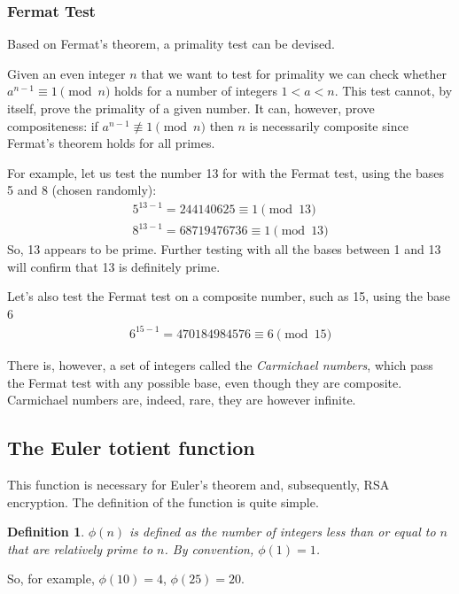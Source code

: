 \documentclass[12pt, titlepage]{article}
\newtheorem*{definition}{Definition}
\begin{document}
    \subsubsection{Fermat Test}
        Based on Fermat's theorem, a primality test can be devised.

        Given an even integer $n$ that we want to test for primality we can check whether
        $a^{n-1} \equiv 1 \pmod{n}$ holds for a number of integers $1<a<n$.  This test cannot,
        by itself, prove the primality of a given number. It can, however, prove compositeness:
        if $a^{n-1} \not\equiv 1 \pmod{n}$ then $n$ is necessarily composite since Fermat's
        theorem holds for all primes. \cite{primality_akalin}

        For example, let us test the number 13 for with the Fermat test, using the bases 5 and 8
        (chosen randomly):
        \begin{align*}
            5^{13-1} = 244140625   \equiv 1 \pmod{13}\\
            8^{13-1} = 68719476736 \equiv 1 \pmod{13}
        \end{align*}
        So, 13 appears to be prime. Further testing with all the bases between 1 and 13 will
        confirm that 13 is definitely prime.

        Let's also test the Fermat test on a composite number, such as 15, using the base 6
        \begin{align*}
            6^{15-1} = 470184984576 \equiv 6 \pmod{15}
        \end{align*}

        There is, however, a set of integers called the \emph{Carmichael numbers}, which pass
        the Fermat test with any possible base, even though they are composite. Carmichael
        numbers are, indeed, rare, they are however infinite. \autocite[116]{dence}
    
    \subsection{The Euler totient function}
    This function is necessary for Euler's theorem and, subsequently, RSA encryption. The
    definition of the function is quite simple.
    \begin{definition}
        $\phi(n)$ is defined as the \emph{number} of integers less than or equal to $n$ that
        are relatively prime to $n$. By convention, $\phi(1) = 1$.
    \end{definition}
    So, for example, $\phi(10) = 4$, $\phi(25) = 20$.
\end{document}
